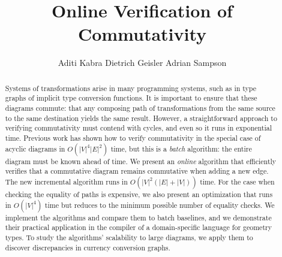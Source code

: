 \documentclass[sigplan,review,nonacm=true]{acmart}
\begin{document}
\title{Online Verification of Commutativity}
%
%
\author{Aditi Kabra \quad Dietrich Geisler \quad Adrian Sampson}
\acmDOI{} %

\begin{abstract}
Systems of transformations arise in many programming systems, such as in type graphs of implicit type conversion functions.
It is important to ensure that these diagrams commute: that any composing path of transformations from the same source to the same destination yields the same result.
However, a straightforward approach to verifying commutativity must contend with cycles, and even so it runs in exponential time.
Previous work has shown how to verify commutativity in the special case of acyclic diagrams in $O(|V|^4|E|^2)$ time,
but this is a \emph{batch} algorithm: the entire diagram must be known ahead of time.
We present an \emph{online} algorithm that efficiently verifies that a commutative diagram remains commutative when adding a new edge.
The new incremental algorithm runs in $O(|V|^2(|E| + |V|))$ time.
For the case when checking the equality of paths is expensive, we also present an optimization that runs in $O(|V|^4)$ time but reduces to the minimum possible number of equality checks.
We implement the algorithms and compare them to batch baselines, and we demonstrate their practical application in the compiler of a domain-specific language for geometry types.
To study the algorithms' scalability to large diagrams, we apply them to discover discrepancies in currency conversion graphs.
\end{abstract}

\maketitle
\end{document}
